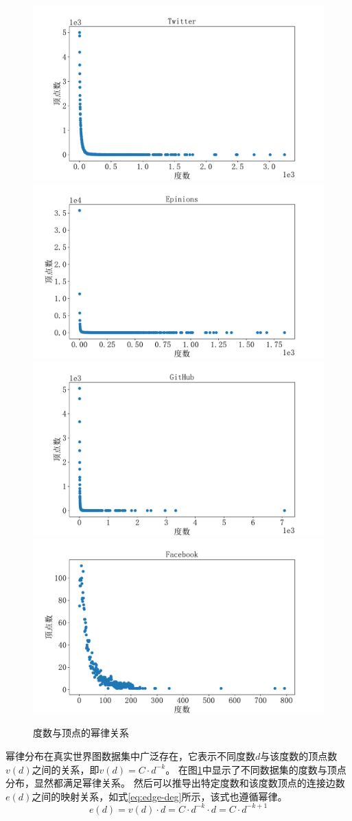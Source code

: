 \documentclass[master]{thesis-uestc}
\begin{document}
\begin{figure}
    \includegraphics[width=0.5\linewidth]{pic/vertex/Twitter.pdf}%
    \includegraphics[width=0.5\linewidth]{pic/vertex/Epinions.pdf}\\
    \includegraphics[width=0.5\linewidth]{pic/vertex/GitHub.pdf}%
    \includegraphics[width=0.5\linewidth]{pic/vertex/Facebook.pdf}
    \caption{度数与顶点的幂律关系}
    \label{fig:pow-law-vertex}
\end{figure}
    幂律分布在真实世界图数据集中广泛存在，它表示不同度数$d$与该度数的顶点数$v(d)$之间的关系，即$v(d)=C·d^{-k}$。
在图\ref{fig:pow-law-vertex}中显示了不同数据集的度数与顶点分布，显然都满足幂律关系。
然后可以推导出特定度数和该度数顶点的连接边数$e(d)$之间的映射关系，如式\ref{eq:edge-deg}所示，该式也遵循幂律。
\begin{equation}
    e(d)=v(d) \cdot d=C \cdot d^{-k} \cdot d=C \cdot d^{-k+1}
    \label{eq:edge-deg}
\end{equation}
    
\end{document}
